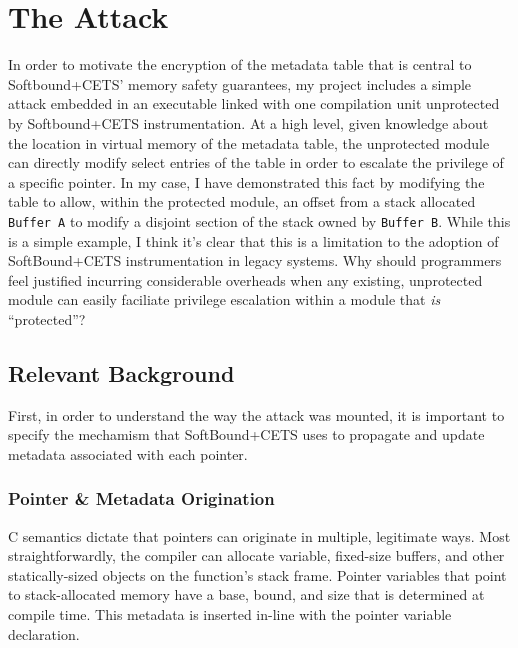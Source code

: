 \documentclass{article}
\begin{document}
\section{The Attack}

    In order to motivate the encryption of the metadata table that is central 
    to Softbound+CETS' memory safety guarantees, my project includes a simple 
    attack embedded in an executable linked with one compilation unit 
    unprotected by Softbound+CETS instrumentation. At a high level, given
    knowledge about the location in virtual memory of the metadata table,
    the unprotected module can directly modify select entries of the table
    in order to escalate the privilege of a specific pointer. In my case,
    I have demonstrated this fact by modifying the table to allow, within the
    protected module, an offset from a stack allocated \verb|Buffer A| to 
    modify a disjoint section of the stack owned by \verb|Buffer B|. 
    While this is a simple example, I think it's clear that this is a
    limitation to the adoption of SoftBound+CETS instrumentation in legacy 
    systems. Why should programmers feel justified incurring considerable overheads when 
    any existing, unprotected module can easily faciliate privilege escalation
    within a module that \textit{is} ``protected''?



    \subsection{Relevant Background}

        First, in order to understand the way the attack was mounted, it is
        important to specify the mechamism that SoftBound+CETS uses to
        propagate and update metadata associated with each pointer.

        \subsubsection{Pointer \& Metadata Origination}

            C semantics dictate that pointers can originate in multiple,
            legitimate ways. Most straightforwardly, the compiler can allocate
            variable, fixed-size buffers, and other statically-sized objects on
            the function's stack frame. Pointer variables that point to
            stack-allocated memory have a base, bound, and size that is
            determined at compile time. This metadata is inserted in-line with
            the pointer variable declaration. 
            
\end{document}
